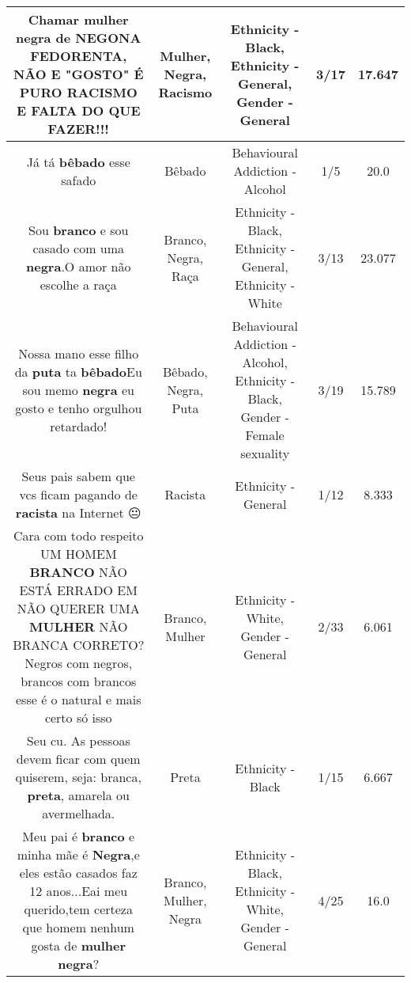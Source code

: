 \documentclass[11pt]{article}
\newlength\mylength
\begin{document}
\begin{center}
\begin{longtable}{|C{.65\mylength}|C{.30\mylength}|C{.12\mylength}|C{.12\mylength}|C{.12\mylength}|}
  \small Chamar \textbf{mulher} \textbf{negra} de NEGONA FEDORENTA, NÃO E "GOSTO" É PURO \textbf{RACISMO} E FALTA DO QUE FAZER!!!\normalsize   & Mulher, Negra, Racismo & Ethnicity - Black, Ethnicity - General, Gender - General & 3/17 & 17.647 \\  \hline
  \small Já   tá  \textbf{bêbado}  esse safado\normalsize   & Bêbado & Behavioural Addiction - Alcohol & 1/5 & 20.0 \\  \hline
  \small Sou \textbf{branco} e sou casado com uma \textbf{negra}.O amor não escolhe a raça\normalsize   & Branco, Negra, Raça & Ethnicity - Black, Ethnicity - General, Ethnicity - White & 3/13 & 23.077 \\  \hline
  \small Nossa mano esse filho da \textbf{puta} ta \textbf{bêbado}Eu sou memo \textbf{negra} eu gosto e tenho orgulhou retardado!\normalsize   & Bêbado, Negra, Puta & Behavioural Addiction - Alcohol, Ethnicity - Black, Gender - Female sexuality & 3/19 & 15.789 \\  \hline
  \small Seus pais sabem que vcs ficam pagando de \textbf{racista} na Internet 😐\normalsize   & Racista & Ethnicity - General & 1/12 & 8.333 \\  \hline
  \small Cara com todo respeito UM HOMEM \textbf{BRANCO} NÃO ESTÁ ERRADO EM NÃO QUERER UMA \textbf{MULHER} NÃO BRANCA CORRETO? Negros com negros, brancos com brancos esse é o natural e mais certo só isso\normalsize   & Branco, Mulher & Ethnicity - White, Gender - General & 2/33 & 6.061 \\  \hline
  \small Seu cu. As pessoas devem ficar com quem quiserem, seja: branca, \textbf{preta}, amarela ou avermelhada.\normalsize   & Preta & Ethnicity - Black & 1/15 & 6.667 \\  \hline
  \small Meu pai é \textbf{branco} e minha mãe é \textbf{Negra},e eles estão casados faz 12 anos...Eai meu querido,tem certeza que homem nenhum gosta de \textbf{mulher} \textbf{negra}?\normalsize   & Branco, Mulher, Negra & Ethnicity - Black, Ethnicity - White, Gender - General & 4/25 & 16.0 \\  \hline

\end{longtable}
\end{center}
\end{document}

